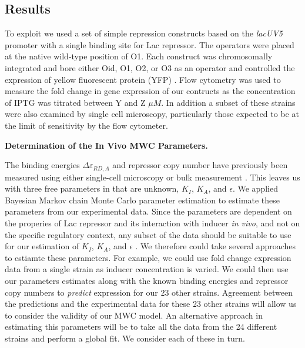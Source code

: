 \pagebreak
\subsection*{Results}


To exploit \eref[eq7] we used a set of simple repression constructs based on the \textit{lacUV5} promoter with a single binding site for Lac repressor. The operators were placed at the native wild-type position of O1. Each construct was chromosomally integrated and bore either Oid, O1, O2, or O3 as an operator and controlled the expression of yellow fluorescent protein (YFP) \cite{Garcia2011}. Flow cytometry was used to measure the fold change in gene expression of our contructs as the concentration of IPTG was titrated between Y and Z $\mu M$. In addition a subset of these strains were also examined by single cell microscopy, particularly those expected to be at the limit of sensitivity by the flow cytometer. 

\noindent \textbf{Determination of the In Vivo MWC Parameters.}

The binding energies $\Delta \varepsilon_{RD,A}$ and repressor copy number have previously been measured using either single-cell microscopy or bulk measurement \cite{Oehler1994,Vilar2003,Garcia2011, Brewster2014}. This leaves us with three free parameters in \eref[eq7] that are unknown, $K_I$, $K_A$, and $\epsilon$. We applied Bayesian Markov chain Monte Carlo parameter estimation to estimate these parameters from our experimental data. Since the parameters are dependent on the properies of Lac repressor and its interaction with inducer \textit{in vivo}, and not on the specific regulatory context, any subset of the data should be suitable to use for our estimation of $K_I$, $K_A$, and $\epsilon$ . We therefore could take several approaches to estiamte these parameters. 
For example, we could use fold change expression data from a single strain as inducer concentration is varied. We could then use our parameters estimates along with the known binding energies and repressor copy numbers to \textit{predict} expression for our 23 other strains. Agreement between the predictions and the experimental data for these 23 other strains will allow us to consider the validity of our MWC model. An alternative approach in estimating this parameters will be to take all the data from the 24 different strains and perform a global fit. We consider each of these in turn.

